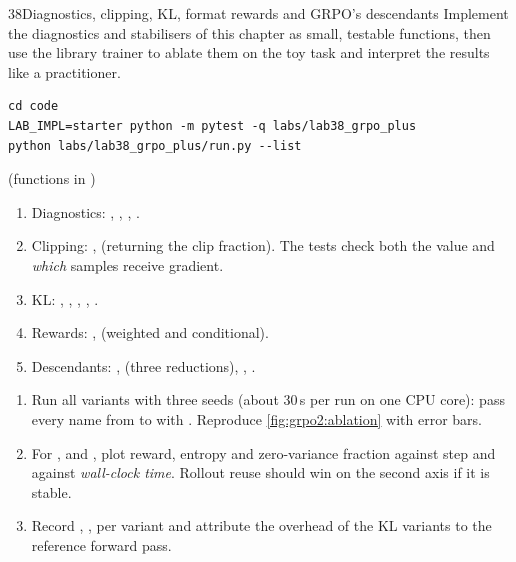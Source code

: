 \begin{labbox}{38}{Diagnostics, clipping, KL, format rewards and GRPO's descendants}
Implement the diagnostics and stabilisers of this chapter as small, testable functions, then
use the library trainer to ablate them on the toy task and interpret the results like a
practitioner.

\begin{lstlisting}[style=shell]
cd code
LAB_IMPL=starter python -m pytest -q labs/lab38_grpo_plus
python labs/lab38_grpo_plus/run.py --list
\end{lstlisting}

 (functions in )
\begin{enumerate}
\item Diagnostics: , ,
, .
\item Clipping: ,  (returning the clip
fraction). The tests check both the value and \emph{which} samples receive gradient.
\item KL: , , , ,
.
\item Rewards: ,  (weighted and conditional).
\item Descendants: ,  (three
reductions), , .
\end{enumerate}

\begin{enumerate}
\item Run all variants with three seeds (about 30\,s per run on one CPU core):
pass every name from  to  with . Reproduce \cref{fig:grpo2:ablation} with
error bars.
\item For ,  and , plot reward, entropy
and zero-variance fraction against step and against \emph{wall-clock time}. Rollout reuse
should win on the second axis if it is stable.
\item Record , ,  per variant and attribute
the overhead of the KL variants to the reference forward pass.
\end{enumerate}


\end{labbox}
